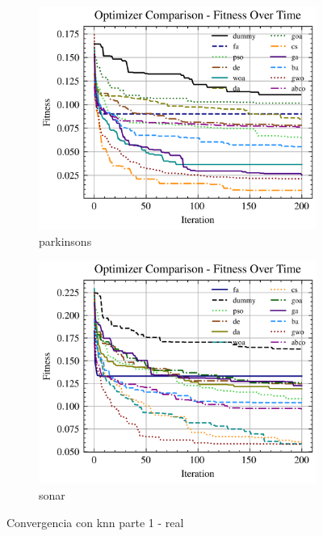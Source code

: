 \begin{figure}[htp]
\begin{subfigure}[htp]{0.45\textwidth}
        \includegraphics[width=\textwidth]{imagenes/fitness_charts/img/real/parkinsons/optimizers_fitness_knn.png}
        \caption{parkinsons}
    \end{subfigure}
    \begin{subfigure}[htp]{0.45\textwidth}
        \includegraphics[width=\textwidth]{imagenes/fitness_charts/img/real/sonar/optimizers_fitness_knn.png}
        \caption{sonar}
    \end{subfigure}
    \caption{Convergencia con knn parte 1 - real}
    \label{fig:convergencia_knn_1_real}
\end{figure}

